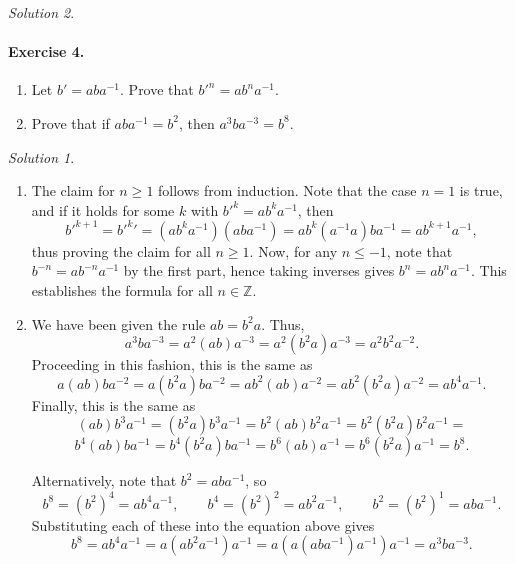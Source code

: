 \documentclass[11pt]{report}
\def\Z{\mathbb{Z}}
\theoremstyle{remark}
\newtheorem*{solution}{Solution}
\begin{document}
\begin{solution}
    \paragraph{Exercise 4.} \mbox{}
    \begin{enumerate}
        \itemsep0em
        \item Let $b' = aba^{-1}$. Prove that $b'^n = a b^na^{-1}$.
        \item Prove that if $aba^{-1} = b^2$, then $a^3ba^{-3} = b^8$.
    \end{enumerate}
    \begin{solution} \mbox{}
    \begin{enumerate}
        \item The claim for $n \geq 1$ follows from induction. Note that the case $n
        = 1$ is true, and if it holds for some $k$ with $b'^k = ab^ka^{-1}$, then \[
            b'^{k + 1} = b'^k' = (ab^ka^{-1})(aba^{-1}) = ab^k(a^{-1}a)ba^{-1} =
            ab^{k + 1}a^{-1},
        \] thus proving the claim for all $n \geq 1$.
        Now, for any $n \leq -1$, note that $b^{-n} = ab^{-n}a^{-1}$ by the first
        part, hence taking inverses gives $b^n = ab^{n}a^{-1}$. This establishes the
        formula for all $n \in \Z$.

        \item We have been given the rule $ab = b^2a$. Thus, \[
            a^3ba^{-3} = a^2(ab)a^{-3} = a^2(b^2a)a^{-3} = a^2b^2a^{-2}.
        \] Proceeding in this fashion, this is the same as \[
            a(ab)ba^{-2} = a(b^2a)ba^{-2} = ab^2(ab)a^{-2} = ab^2(b^2a)a^{-2} =
            ab^4a^{-1}.
        \] Finally, this is the same as \[
            (ab)b^3a^{-1} = (b^2a)b^3a^{-1} = b^2(ab)b^2a^{-1} = b^2(b^2a)b^2a^{-1} =
        \] \[
            b^4(ab)ba^{-1} = b^4(b^2a)ba^{-1} = b^6(ab)a^{-1} = b^6(b^2a)a^{-1} =
            b^8.
        \] 


        Alternatively, note that $b^2 = aba^{-1}$, so \[
            b^8 = (b^2)^4 = ab^4a^{-1}, \qquad
            b^4 = (b^2)^2 = ab^2a^{-1}, \qquad
            b^2 = (b^2)^1 = aba^{-1}.
        \] Substituting each of these into the equation above gives \[
            b^8 = ab^4a^{-1} = a(ab^2a^{-1})a^{-1} = a(a(aba^{-1})a^{-1})a^{-1} =
            a^3ba^{-3}.
        \] 
    \end{enumerate}
    \end{solution}
    

\end{solution}
\end{document}
